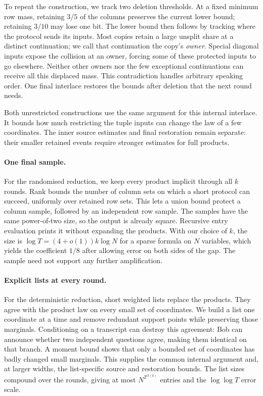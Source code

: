 \documentclass[11pt]{article} \usepackage[utf8]{inputenc}
\theoremstyle{plain} \newtheorem{theorem}{Theorem}[section]
\theoremstyle{definition} \newaliascnt{definition}{theorem}
\begin{document}
To repeat the construction, we track two deletion thresholds. At a fixed
minimum row mass, retaining $3/5$ of the columns preserves the current
lower bound; retaining $3/10$ may lose one bit.
The lower bound then follows by tracking where the protocol sends its
inputs. Most copies retain a large unsplit share at a distinct
continuation; we call that continuation the copy's \emph{owner}.
Special diagonal inputs expose the collision at an owner, forcing some
of these protected inputs to go elsewhere.
Neither other owners nor the few exceptional continuations can receive
all this displaced mass. This contradiction handles arbitrary speaking
order. One final interlace restores the bounds after deletion that the
next round needs.

Both unrestricted constructions use the same argument for this internal
interlace. It bounds how much restricting the tuple inputs can change the
law of a few coordinates. The inner source estimates and final restoration
remain separate: their smaller retained events require stronger estimates
for full products.

\paragraph{One final sample.}
For the randomised reduction, we keep every product implicit through all
$k$ rounds. Rank bounds the number of column sets on which a short protocol
can succeed, uniformly over retained row sets. This lets a union bound
protect a column sample, followed by an independent row sample.
The samples have the same power-of-two size, so the output is already
square. Recursive entry evaluation prints it without expanding the products.
With our choice of $k$, the size is $\log T=(4+o(1))k\log N$ for a
sparse formula on $N$ variables,
which yields the coefficient $1/8$ after allowing error on both sides of
the gap. The sample need not support any further amplification.

\paragraph{Explicit lists at every round.}
For the deterministic reduction, short weighted lists replace the products.
They agree with the product law on every small set of coordinates.
We build a list one coordinate at a time and remove redundant support
points while preserving those marginals.
Conditioning on a transcript can destroy this agreement: Bob can announce
whether two independent questions agree, making them identical on that
branch. A moment bound shows that only a bounded set of coordinates has
badly changed small marginals. This supplies the common internal argument
and, at larger widths, the list-specific source and restoration bounds.
The list sizes compound over the rounds, giving at most $N^{2^{O(k)}}$
entries and the $\log\log T$ error scale.
\end{document}

